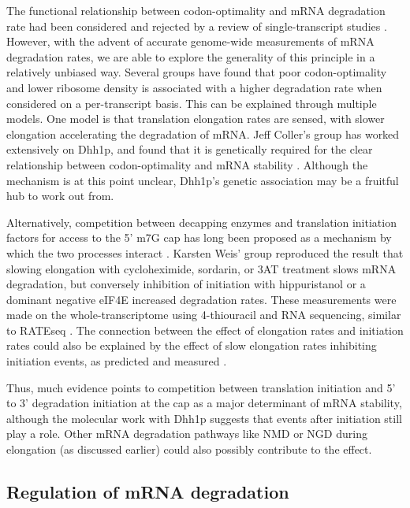 The functional relationship between codon-optimality
and mRNA degradation rate had been considered and rejected by a review
of single-transcript studies 
\parencite{caponigro1996mechanisms}. However,
with the advent of accurate genome-wide measurements of mRNA
degradation rates, we are able to explore the generality of this
principle in a relatively unbiased way. Several groups 
\parencite{presnyak2015codon,neymotin2016multiple,harigaya2016codon,cheng2017cis}
have found that poor codon-optimality and lower ribosome density
is associated with a higher degradation rate when considered on a
per-transcript basis. This can be explained through multiple models.
One model is that translation elongation rates are sensed, with slower
elongation accelerating the degradation of mRNA. Jeff Coller's group
has worked extensively on Dhh1p, and found that it is genetically
required for the clear relationship between codon-optimality and mRNA
stability 
\parencite{presnyak2015codon,radhakrishnan2016dead}. Although
the mechanism is at this point unclear, Dhh1p's genetic association 
may be a fruitful hub to work out from.  

Alternatively, competition between
decapping enzymes and translation initiation factors for access to the
5' m7G cap has long been proposed as a mechanism by which the two
processes interact 
\parencite{schwartz1999mutations,schwartz2000mrna}. Karsten Weis' group 
\parencite{chan2017non} reproduced the result
that slowing elongation with cycloheximide, sordarin, or 3AT treatment
slows mRNA degradation, but conversely inhibition of initiation with
hippuristanol or a dominant negative eIF4E increased degradation
rates. These measurements were made on the whole-transcriptome using
4-thiouracil and RNA sequencing, similar to RATEseq 
\parencite{neymotin2014determination}. 
The connection between the effect of elongation rates and
initiation rates could also be explained by the effect of slow
elongation rates inhibiting initiation events, as predicted 
\parencite{shah2013rate} and measured \parencite{chu2014translation}.

Thus, much evidence points
to competition between translation initiation and 5' to 3' degradation
initiation at the cap as a major determinant of mRNA stability,
although the molecular work with Dhh1p suggests that events after
initiation still play a role. Other mRNA degradation pathways like NMD
or NGD during elongation (as discussed earlier) could also possibly
contribute to the effect.  

\subsection{ Regulation of mRNA degradation }

